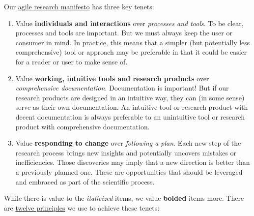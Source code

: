 \documentclass{tufte-book} %
\begin{document}
Our \href{http://agilemanifesto.org/}{agile research manifesto} has three key
tenets:
\begin{enumerate}
\item Value \textbf{individuals and interactions} over
  \textit{processes and tools}.  To be clear, processes and tools are
  important.  But we must always keep the user or consumer in mind.
  In practice, this means that a simpler (but potentially less
  comprehensive) tool or approach may be preferable in that it could
  be easier for a reader or user to make sense of.
\item Value \textbf{working, intuitive tools and research products}
  over \textit{comprehensive documentation}.  Documentation is
  important!  But if our research products are designed in an
  intuitive way, they can (in some sense) serve as their own
  documentation.  An intuitive tool or research product with decent
  documentation is always preferable to an unintuitive tool or
  research product with comprehensive documentation.
\item Value \textbf{responding to change} over \textit{following a
    plan}.  Each new step of the research process brings new insights
  and potentially uncovers mistakes or inefficiencies.  Those
  discoveries may imply that a new direction is better than a
  previously planned one.  These are opportunities that should be
  leveraged and embraced as part of the scientific process.
\end{enumerate}
While there is value to the \textit{italicized} items, we value
\textbf{bolded} items more.  There are \href{http://www.agilemanifesto.org/principles.html}{twelve
  principles} we use to achieve these tenets:
\end{document}
